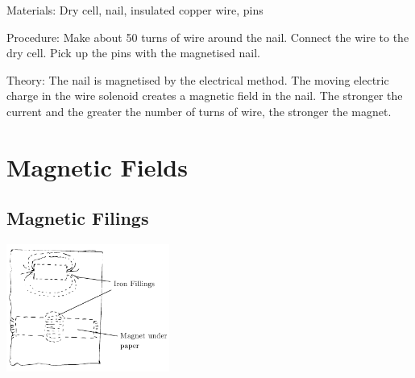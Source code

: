 \begin{multicols}{2}
\begin{description*}
\item[Materials:]{Dry cell, nail, insulated copper wire, pins}
\item[Procedure:]{Make about 50 turns of wire around the nail. Connect the wire to the dry cell. Pick up the pins with the magnetised nail.}
\item[Theory:]{The nail is magnetised by the electrical method. The moving electric charge in the wire solenoid creates a magnetic field in the nail. The stronger the current and the greater the number of turns of wire, the stronger the magnet.}
\end{description*}


\section*{Magnetic Fields}


\subsection{Magnetic Filings}

\begin{center}
\includegraphics[width=0.4\textwidth]{./img/magnetic-fields.png}
\end{center}


\end{multicols}
